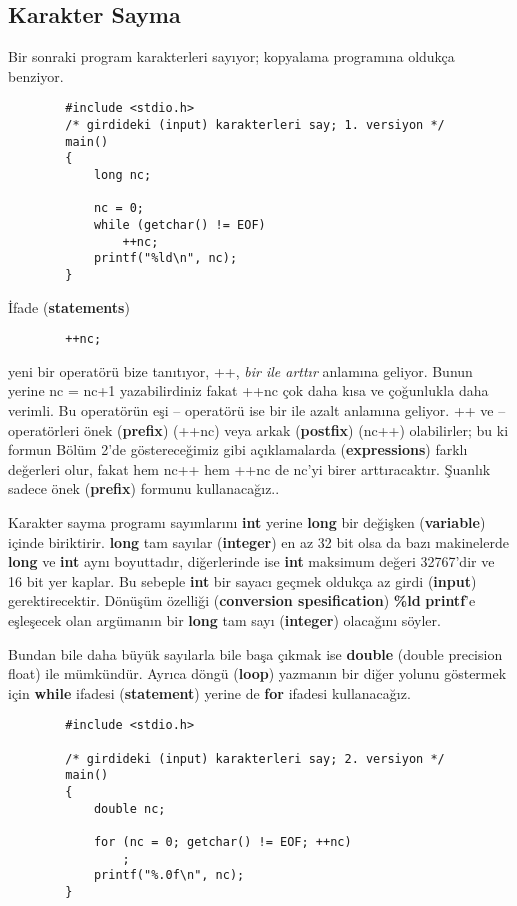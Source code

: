 \documentclass[a4paper,12pt,oneside]{book}
\begin{document}
\subsection{Karakter Sayma}

Bir sonraki program karakterleri sayıyor; kopyalama programına oldukça benziyor.
\begin{lstlisting}
		#include <stdio.h>
		/* girdideki (input) karakterleri say; 1. versiyon */
		main()
		{
			long nc;

			nc = 0;
			while (getchar() != EOF)
				++nc;
			printf("%ld\n", nc);
		}
\end{lstlisting}
\par İfade (\textbf{statements})
\begin{lstlisting}
		++nc;
\end{lstlisting}
yeni bir operatörü bize tanıtıyor, ++, \textit{bir ile arttır} anlamına geliyor. Bunun yerine nc = nc+1 yazabilirdiniz fakat ++nc çok daha kısa ve çoğunlukla daha verimli. Bu operatörün eşi -- operatörü ise bir ile azalt anlamına geliyor. ++ ve -- operatörleri önek (\textbf{prefix}) (++nc) veya arkak (\textbf{postfix}) (nc++) olabilirler; bu ki formun Bölüm 2'de göstereceğimiz gibi açıklamalarda (\textbf{expressions}) farklı değerleri olur, fakat hem nc++ hem ++nc de nc'yi birer arttıracaktır. Şuanlık sadece önek (\textbf{prefix}) formunu kullanacağız..
\par Karakter sayma programı sayımlarını \textbf{int} yerine \textbf{long} bir değişken (\textbf{variable}) içinde biriktirir. \textbf{long} tam sayılar (\textbf{integer}) en az 32 bit olsa da bazı makinelerde \textbf{long} ve \textbf{int} aynı boyuttadır, diğerlerinde ise \textbf{int} maksimum değeri 32767'dir ve 16 bit yer kaplar. Bu sebeple \textbf{int} bir sayacı geçmek oldukça az girdi (\textbf{input}) gerektirecektir. Dönüşüm özelliği (\textbf{conversion spesification}) \textbf{\%ld} \textbf{printf}'e eşleşecek olan argümanın  bir \textbf{long} tam sayı (\textbf{integer}) olacağını söyler.
\par Bundan bile daha büyük sayılarla bile başa çıkmak ise \textbf{double} (double precision float) ile mümkündür. Ayrıca döngü (\textbf{loop}) yazmanın bir diğer yolunu göstermek için \textbf{while} ifadesi (\textbf{statement}) yerine de \textbf{for} ifadesi kullanacağız.
\begin{lstlisting}
		#include <stdio.h>

		/* girdideki (input) karakterleri say; 2. versiyon */
		main()
		{
			double nc;

			for (nc = 0; getchar() != EOF; ++nc)
				;
			printf("%.0f\n", nc);
		}
\end{lstlisting}
\end{document}
